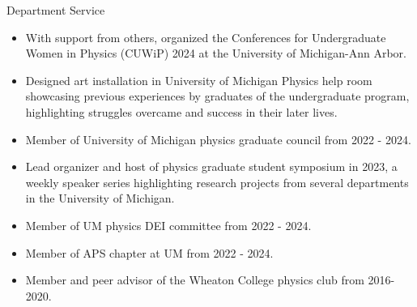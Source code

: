 \documentclass{resume} %
\begin{document}
\begin{rSection}{Department Service}
    \begin{itemize}
        \item With support from others, organized the Conferences for Undergraduate Women in Physics (CUWiP) 2024 at the University of Michigan-Ann Arbor.
        \item Designed art installation in University of Michigan Physics help room showcasing previous experiences by graduates of the undergraduate program, highlighting struggles overcame and success in their later lives.
        \item Member of University of Michigan physics graduate council from 2022 - 2024. 
        \item Lead organizer and host of physics graduate student symposium in 2023, a weekly speaker series highlighting research projects from several departments in the University of Michigan.
    	\item Member of UM physics DEI committee from 2022 - 2024.
	\item Member of APS chapter at UM from 2022 - 2024.
        \item Member and peer advisor of the Wheaton College physics club from 2016-2020.
    \end{itemize}
\end{rSection}
\end{document}
